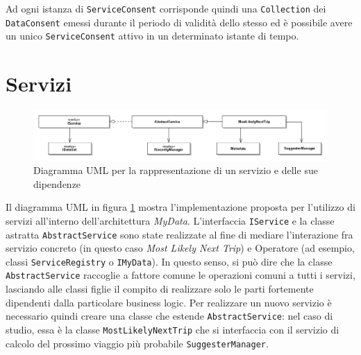 Ad ogni istanza di \texttt{ServiceConsent} corrisponde quindi una \texttt{Collection} dei \texttt{DataConsent} emessi durante il periodo di validit\`a dello stesso ed \`e possibile avere un unico \texttt{ServiceConsent} attivo in un determinato istante di tempo.

\section{Servizi}
\label{sec:P-Service}
\begin{figure} [h]
	\includegraphics[width=\linewidth]{pictures/Services-closed.png}
	\caption{Diagramma UML per la rappresentazione di un servizio e delle sue dipendenze}
	\label{fig:Services-closed}
\end{figure}
Il diagramma UML in figura \ref{fig:Services-closed} mostra l’implementazione proposta per l’utilizzo di servizi all’interno dell’architettura \textit{MyData}. L’interfaccia \texttt{IService} e la classe astratta \texttt{AbstractService} sono state realizzate al fine di mediare l’interazione fra servizio concreto (in questo caso \textit{Most Likely Next Trip}) e Operatore (ad esempio, classi \texttt{ServiceRegistry} o \texttt{IMyData}). In questo senso, si pu\`o dire che la classe \texttt{AbstractService} raccoglie a fattore comune le operazioni comuni a tutti i servizi, lasciando alle classi figlie il compito di realizzare solo le parti fortemente dipendenti dalla particolare business logic. Per realizzare un nuovo servizio \`e necessario quindi creare una classe che estende \texttt{AbstractService}: nel caso di studio, essa \`e la classe \texttt{MostLikelyNextTrip} che si interfaccia con il servizio di calcolo del prossimo viaggio pi\`u probabile \cite{MLNT} \texttt{SuggesterManager}.

